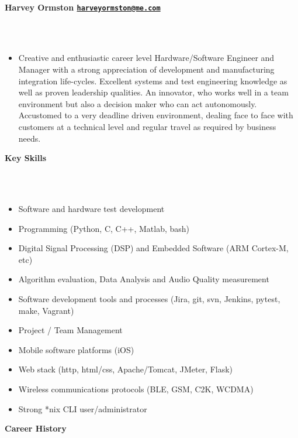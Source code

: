 \documentclass[a4paper,10pt]{article}
\newcommand{\lsep}{-0.5cm}
\newcommand{\resheading}[1]{{\small \colorbox{mygrey}{\begin{minipage}{0.975\textwidth}{\textbf{#1 \vphantom{p\^{E}}}}\end{minipage}}}}
\begin{document}
\hspace{0.5cm}\\[-0.2cm]

\resheading{\textbf{Harvey Ormston \hfill{\href{mailto:harveyormston@me.com}{\nolinkurl{harveyormston@me.com}}}}}\\[\lsep]
\\
\begin{itemize}[align=left]
\item[]Creative and enthusiastic career level Hardware/Software Engineer and
  Manager with a strong appreciation of development and manufacturing
    integration life-cycles. Excellent systems and test engineering knowledge as
    well as proven leadership qualities. An innovator, who works well in a team
    environment but also a decision maker who can act autonomously. Accustomed
    to a very deadline driven environment, dealing face to face with customers
    at a technical level and regular travel as required by business needs.
\\
\end{itemize}

\resheading{\textbf{Key Skills}}\\[\lsep]
\\
\begin{itemize}[label=\FilledSmallSquare, leftmargin=50pt]
\item Software and hardware test development
\item Programming (Python, C, C++, Matlab, bash)
\item Digital Signal Processing (DSP) and Embedded Software (ARM Cortex-M, etc)
\item Algorithm evaluation, Data Analysis and Audio Quality measurement
\item Software development tools and processes (Jira, git, svn, Jenkins, pytest, make, Vagrant)
\item Project / Team Management
\item Mobile software platforms (iOS)
\item Web stack (http, html/css, Apache/Tomcat, JMeter, Flask)
\item Wireless communications protocols (BLE, GSM, C2K, WCDMA)
\item Strong *nix CLI user/administrator
\\
\end{itemize}

\resheading{\textbf{Career History}}\\[\lsep]
\end{document}
